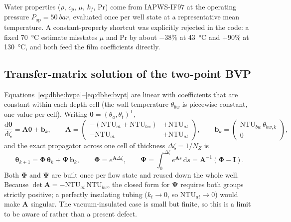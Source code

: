 \documentclass[11pt]{article}
\providecommand{\celsius}{\degreeCelsius}
\begin{document}
Water properties ($\rho$, $c_p$, $\mu$, $k_f$, $\mathrm{Pr}$) come from
IAPWS-IF97 at the operating pressure $P_{\mathrm{op}}=\SI{50}{bar}$, evaluated
once per well state at a representative mean temperature. A constant-property
shortcut was explicitly rejected in the code: a fixed \SI{70}{\celsius} estimate
misstates $\mu$ and $\mathrm{Pr}$ by about $-38\%$ at \SI{43}{\celsius} and
$+90\%$ at \SI{130}{\celsius}, and both feed the film coefficients directly.

\subsection{Transfer-matrix solution of the two-point BVP}
\label{sec:dbhe:transfer}

Equations~\eqref{eq:dbhe:bvpa}--\eqref{eq:dbhe:bvpt} are linear with
coefficients that are constant within each depth cell (the wall temperature
$\theta_{bw}$ is piecewise constant, one value per cell). Writing
$\boldsymbol{\theta}=(\theta_a,\theta_t)^{\mathsf T}$,
\begin{equation}
\frac{\mathrm{d}\boldsymbol{\theta}}{\mathrm{d}\zeta}
=\mathbf{A}\boldsymbol{\theta}+\mathbf{b}_k, \qquad \mathbf{A}=\begin{pmatrix}
-\left(\mathrm{NTU}_{at}+\mathrm{NTU}_{bw}\right) & +\mathrm{NTU}_{at}\\[2pt]
-\mathrm{NTU}_{at} & +\mathrm{NTU}_{at} \end{pmatrix}, \qquad
\mathbf{b}_k=\begin{pmatrix}\mathrm{NTU}_{bw}\,\theta_{bw,k}\\[2pt]
0\end{pmatrix},
\label{eq:dbhe:Amatrix}
\end{equation}
and the exact propagator across one cell of thickness $\Delta\zeta=1/N_Z$ is
\begin{equation}
\boldsymbol{\theta}_{k+1}=\boldsymbol{\Phi}\,\boldsymbol{\theta}_{k}
+\boldsymbol{\Psi}\,\mathbf{b}_k, \qquad \boldsymbol{\Phi}=e^{\mathbf{A}\Delta\zeta}, \qquad
\boldsymbol{\Psi}=\int_0^{\Delta\zeta}\!e^{\mathbf{A}s}\,\mathrm{d}s
=\mathbf{A}^{-1}\left(\boldsymbol{\Phi}-\mathbf{I}\right).
\label{eq:dbhe:PhiPsi}
\end{equation}
Both $\boldsymbol{\Phi}$ and $\boldsymbol{\Psi}$ are built once per flow state
and reused down the whole well. Because $\det\mathbf{A}=-\mathrm{NTU}_{at}\,
\mathrm{NTU}_{bw}$, the closed form for $\boldsymbol{\Psi}$ requires both
groups strictly positive; a perfectly insulating tubing ($k_t\to0$, so
$\mathrm{NTU}_{at}\to0$) would make $\mathbf{A}$ singular. The vacuum-insulated
case is small but finite, so this is a limit to be aware of rather than a
present defect.
\end{document}
